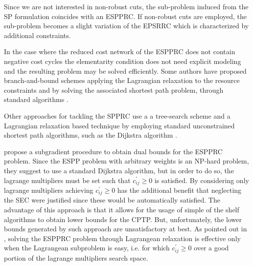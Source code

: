 Since we are not interested in non-robust cuts, the sub-problem
induced from the SP formulation coincides with an ESPPRC.
If non-robust cuts are employed, the sub-problem becomes
a slight variation of the EPSRRC which is characterized by additional constraints.

\medskip

In the case where the reduced cost network of the ESPPRC does not contain negative cost cycles
the elementarity condition does not need explicit modeling
and the resulting problem may be solved efficiently.
Some authors have proposed branch-and-bound
schemes applying the Lagrangian relaxation to the resource constraints
and by solving the associated shortest path
problem, through standard algorithms \parencite{beasley1989, carlyle2008}.

Other approaches for tackling the SPPRC use a
a tree-search scheme and a Lagrangian relaxation based
technique by employing standard unconstrained shortest path
algorithms, such as the Dijkstra algorithm \parencite{beasley1989}.

\medskip

\cite{beasley1989} propose a subgradient procedure to obtain dual bounds for the ESPPRC problem.
Since the ESPP problem with arbitrary weights is an NP-hard problem, they suggest to use a standard Dijkstra algorithm, but in order to do so, the lagrange multipliers must be set such that $c^\prime_{ij} \ge 0$ is satisfied.
By considering only lagrange multipliers achieving $c^\prime_{ij} \ge 0$ has the additional benefit that neglecting the SEC were justified since these would be automatically satisfied.
The advantage of this approach is that it allows for the usage of simple of the shelf algorithms to obtain lower bounds for the CPTP.
But, unfortunately, the lower bounds generated by such approach are unsatisfactory at best.
As pointed out in \cite{righini2004}, solving the ESPPRC problem through Lagrangean relaxation is effective only when the Lagrangean subproblem is easy, i.e. for which $c^\prime_{ij} \ge 0$ over a good portion of the lagrange multipliers search space.


\begin{comment}
\cite{bettinelli2010mathematical} ---------------
It is possible to address the pricing problem by optimizing its relaxation,
obtained by dropping the elementarity constraints. Solving a resource con-
strained shortest path problem (RCSPP) requires less computing time but
yields less tight lower bounds, since columns may include cycles. The two
different approaches have been followed for instance by Feillet et al. [42] and
Desrochers et al. [29] to solve the vehicle routing problem with time windows
(VRPTW) through column generation.
\end{comment}

